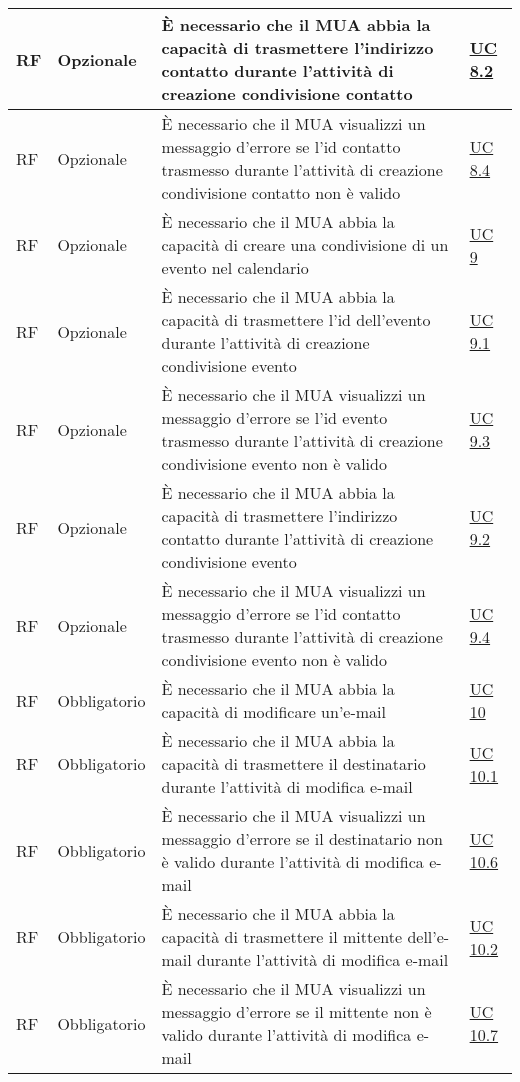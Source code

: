 \begin{longtable}{*{1}{>{\centering\arraybackslash}p{1.5cm}}*{1}{>{\centering\arraybackslash}p{2.5cm}}p{6cm}*{1}{>{\centering\arraybackslash}p{3cm}}}
    \\\hline
    RF & Opzionale & È necessario che il MUA abbia la capacità di trasmettere l'indirizzo contatto durante l'attività di creazione condivisione contatto & \hyperref[sec:UC8.2]{UC 8.2}
    \\\hline
    RF & Opzionale & È necessario che il MUA visualizzi un messaggio d'errore se l'id contatto trasmesso durante l'attività di creazione condivisione contatto non è valido & \hyperref[sec:UC8.4]{UC 8.4}
    \\\hline
    RF & Opzionale & È necessario che il MUA abbia la capacità di creare una condivisione di un evento nel calendario & \hyperref[sec:UC9]{UC 9}
    \\\hline
    RF & Opzionale & È necessario che il MUA abbia la capacità di trasmettere l'id dell'evento durante l'attività di creazione condivisione evento & \hyperref[sec:UC9.1]{UC 9.1}
    \\\hline
    RF & Opzionale & È necessario che il MUA visualizzi un messaggio d'errore se l'id evento trasmesso durante l'attività di creazione condivisione evento non è valido & \hyperref[sec:UC9.3]{UC 9.3}
    \\\hline
    RF & Opzionale & È necessario che il MUA abbia la capacità di trasmettere l'indirizzo contatto durante l'attività di creazione condivisione evento & \hyperref[sec:UC9.2]{UC 9.2}
    \\\hline
    RF & Opzionale & È necessario che il MUA visualizzi un messaggio d'errore se l'id contatto trasmesso durante l'attività di creazione condivisione evento non è valido & \hyperref[sec:UC9.4]{UC 9.4}
    \\\hline
    RF & Obbligatorio & È necessario che il MUA abbia la capacità di modificare un'e-mail & \hyperref[sec:UC10]{UC 10}
    \\\hline
    RF & Obbligatorio & È necessario che il MUA abbia la capacità di trasmettere il destinatario durante l'attività di modifica e-mail & \hyperref[sec:UC10.1]{UC 10.1}
    \\\hline
    RF & Obbligatorio & È necessario che il MUA visualizzi un messaggio d'errore se il destinatario non è valido durante l'attività di modifica e-mail & \hyperref[sec:UC10.6]{UC 10.6}
    \\\hline
    RF & Obbligatorio & È necessario che il MUA abbia la capacità di trasmettere il mittente dell'e-mail durante l'attività di modifica e-mail & \hyperref[sec:UC10.2]{UC 10.2}
    \\\hline
    RF & Obbligatorio & È necessario che il MUA visualizzi un messaggio d'errore se il mittente non è valido durante l'attività di modifica e-mail & \hyperref[sec:UC10.7]{UC 10.7}

\end{longtable}

